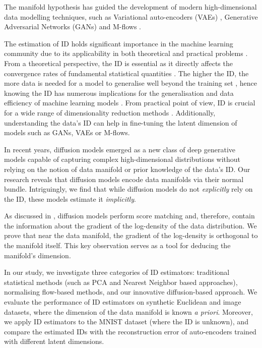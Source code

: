 The manifold hypothesis has guided the development of modern high-dimensional data modelling techniques, such as Variational auto-encoders (VAEs) \cite{vae}, Generative Adversarial Networks (GANs) \cite{gan} and M-flows \cite{brehmer2020flows}. 

The estimation of ID holds significant importance in the machine learning community due to its applicability in both theoretical and practical problems \cite{campadelli2015intrinsic}. From a theoretical perspective, the ID is essential as it directly affects the convergence rates of fundamental statistical quantities \cite{weed2019sharp}. The higher the ID, the more data is needed for a model to generalise well beyond the training set \cite{campadelli2015intrinsic, pope2021intrinsic}, hence knowing the ID has numerous implications for the generalisation and data efficiency of machine learning models \cite{kim2019kde, kpotufe2011knn}.  From practical point of view, ID is crucial for a wide range of dimensionality reduction methods \cite{campadelli2015intrinsic}.  Additionally, understanding the data's ID can help in fine-tuning the latent dimension of models such as GANs, VAEs or M-flows. 


In recent years, diffusion models \cite{diffusion_models, ddpm} emerged as a new class of deep generative models capable of capturing complex high-dimensional distributions without relying on the notion of data manifold or prior knowledge of the data's ID. Our research reveals that diffusion models encode data manifolds via their normal bundle. Intriguingly, we find that while diffusion models do not \textit{explicitly} rely on the ID, these models estimate it \textit{implicitly}.

As discussed in \cite{song2020score, ddpm}, diffusion models perform score matching \cite{score_matching} and, therefore, contain the information about the gradient of the log-density of the data distribution. We prove that near the data manifold, the gradient of the log-density is orthogonal to the manifold itself. This key observation serves as a tool for deducing the manifold's dimension.

In our study, we investigate three categories of ID estimators: traditional statistical methods (such as PCA and Nearest Neighbor based approaches), normalising flow-based methods, and our innovative diffusion-based approach. We evaluate the performance of ID estimators  on synthetic Euclidean and image datasets, where the dimension of the data manifold is known \textit{a priori}. Moreover, we apply ID estimators to the MNIST dataset \cite{mnist} (where the ID is unknown), and compare the estimated IDs with the reconstruction error of auto-encoders trained with different latent dimensions. 

